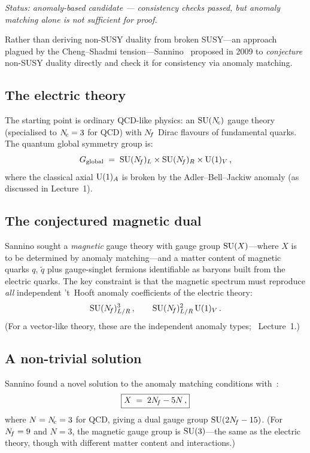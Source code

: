\documentclass[11pt,a4paper]{article}
\begin{document}
\textit{Status: anomaly-based candidate --- consistency checks passed, but anomaly matching alone is not sufficient for proof.}

Rather than deriving non-SUSY duality from broken SUSY---an approach
plagued by the Cheng--Shadmi tension---Sannino~\cite{Sannino2009}
proposed in 2009 to \emph{conjecture} non-SUSY duality directly and
check it for consistency via anomaly matching.

\subsection{The electric theory}

The starting point is ordinary QCD-like physics: an $\mathrm{SU}(N_{\!c})$ gauge
theory (specialised to $N_{\!c} = 3$ for QCD) with $N_{\!f}$ Dirac flavours
of fundamental quarks.  The quantum global symmetry group is:
\begin{equation}\label{eq:qcd-global}
  G_{\mathrm{global}}
  \;=\; \mathrm{SU}(N_{\!f})_L \times \mathrm{SU}(N_{\!f})_R \times \mathrm{U}(1)_V\,,
\end{equation}
where the classical axial $\mathrm{U}(1)_A$ is broken by the Adler--Bell--Jackiw
anomaly (as discussed in Lecture~1).

\subsection{The conjectured magnetic dual}

Sannino sought a \emph{magnetic} gauge theory with gauge group
$\mathrm{SU}(X)$---where $X$ is to be determined by anomaly matching---and a
matter content of magnetic quarks $q$, $\widetilde{q}$ plus
gauge-singlet fermions identifiable as baryons built from the electric
quarks.  The key constraint is that the magnetic spectrum must
reproduce \emph{all} independent 't~Hooft anomaly coefficients
of the electric theory:
\begin{equation}\label{eq:anomaly-conditions}
  \mathrm{SU}(N_{\!f})_{L/R}^3\,,
  \qquad
  \mathrm{SU}(N_{\!f})_{L/R}^2\,\mathrm{U}(1)_V\,.
\end{equation}
(For a vector-like theory, these are the independent anomaly types;
\cf\ Lecture~1.)

\subsection{A non-trivial solution}

Sannino found a novel solution to the anomaly matching conditions
with~\cite{Sannino2009}:
\begin{equation}\label{eq:dual-gauge-group}
  \boxed{X \;=\; 2N_{\!f} - 5N\,,}
\end{equation}
where $N = N_{\!c} = 3$ for QCD, giving a dual gauge group
$\mathrm{SU}(2N_{\!f} - 15)$.  (For $N_{\!f} = 9$ and $N = 3$, the magnetic gauge
group is $\mathrm{SU}(3)$---the same as the electric theory, though with
different matter content and interactions.)
\end{document}
